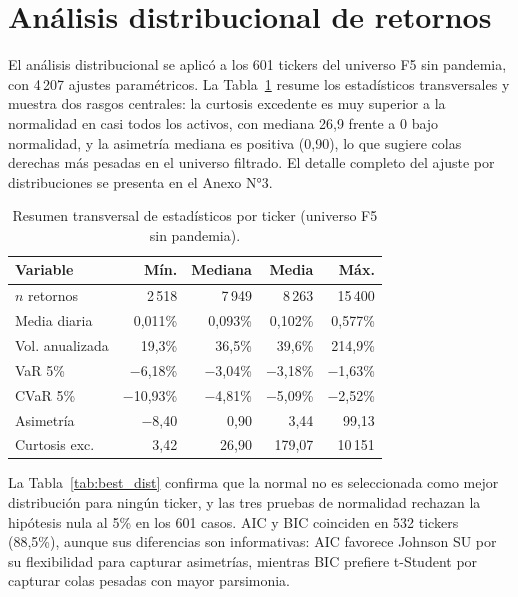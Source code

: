 

\section{An\'alisis distribucional de retornos}

El an\'alisis distribucional se aplic\'o a los 601 tickers del universo F5 sin pandemia, con 4\,207 ajustes param\'etricos. La Tabla~\ref{tab:stats_ticker} resume los estad\'isticos transversales y muestra dos rasgos centrales: la curtosis excedente es muy superior a la normalidad en casi todos los activos, con mediana 26,9 frente a 0 bajo normalidad, y la asimetr\'ia mediana es positiva (0,90), lo que sugiere colas derechas m\'as pesadas en el universo filtrado. El detalle completo del ajuste por distribuciones se presenta en el Anexo N°3.

\begin{table}[h]
\centering
\caption{Resumen transversal de estad\'isticos por ticker (universo F5 sin
pandemia).}
\label{tab:stats_ticker}
\scriptsize
\begin{tabular}{@{}lrrrr@{}}
\toprule
Variable & M\'in. & Mediana & Media & M\'ax. \\
\midrule
$n$ retornos & 2\,518 & 7\,949 & 8\,263 & 15\,400 \\
Media diaria & 0,011\% & 0,093\% & 0,102\% & 0,577\% \\
Vol. anualizada & 19,3\% & 36,5\% & 39,6\% & 214,9\% \\
VaR 5\% & $-$6,18\% & $-$3,04\% & $-$3,18\% & $-$1,63\% \\
CVaR 5\% & $-$10,93\% & $-$4,81\% & $-$5,09\% & $-$2,52\% \\
Asimetr\'ia & $-$8,40 & 0,90 & 3,44 & 99,13 \\
Curtosis exc. & 3,42 & 26,90 & 179,07 & 10\,151 \\
\bottomrule
\end{tabular}
\end{table}

La Tabla~\ref{tab:best_dist} confirma que la normal no es seleccionada como mejor distribuci\'on para ning\'un ticker, y las tres pruebas de normalidad rechazan la hip\'otesis nula al 5\% en los 601 casos. AIC y BIC coinciden en 532 tickers (88,5\%), aunque sus diferencias son informativas: AIC favorece Johnson SU por su flexibilidad para capturar asimetr\'ias, mientras BIC prefiere t-Student por capturar colas pesadas con mayor parsimonia.

